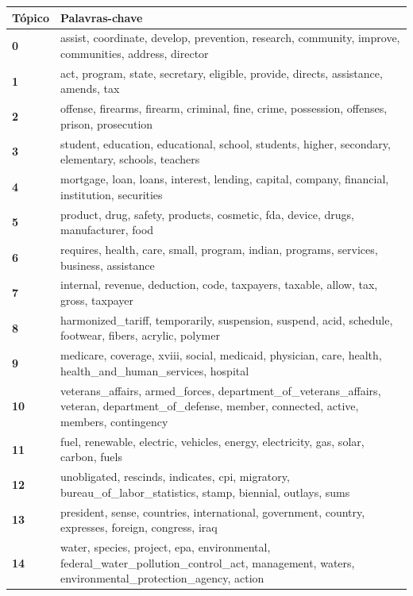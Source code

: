 \begin{table}[htpb]
    \centering
    \scriptsize
    \begin{tabularx}{\textwidth}{@{}l X@{}}
        \toprule
        \textbf{Tópico} & \textbf{Palavras-chave} \\
        \midrule
        \textbf{0} & assist, coordinate, develop, prevention, research, community, improve, communities, address, director \\
        \textbf{1} & act, program, state, secretary, eligible, provide, directs, assistance, amends, tax \\
        \textbf{2} & offense, firearms, firearm, criminal, fine, crime, possession, offenses, prison, prosecution \\
        \textbf{3} & student, education, educational, school, students, higher, secondary, elementary, schools, teachers \\
        \textbf{4} & mortgage, loan, loans, interest, lending, capital, company, financial, institution, securities \\
        \textbf{5} & product, drug, safety, products, cosmetic, fda, device, drugs, manufacturer, food \\
        \textbf{6} & requires, health, care, small, program, indian, programs, services, business, assistance \\
        \textbf{7} & internal, revenue, deduction, code, taxpayers, taxable, allow, tax, gross, taxpayer \\
        \textbf{8} & harmonized\_tariff, temporarily, suspension, suspend, acid, schedule, footwear, fibers, acrylic, polymer \\
        \textbf{9} & medicare, coverage, xviii, social, medicaid, physician, care, health, health\_and\_human\_services, hospital \\
        \textbf{10} & veterans\_affairs, armed\_forces, department\_of\_veterans\_affairs, veteran, department\_of\_defense, member, connected, active, members, contingency \\
        \textbf{11} & fuel, renewable, electric, vehicles, energy, electricity, gas, solar, carbon, fuels \\
        \textbf{12} & unobligated, rescinds, indicates, cpi, migratory, bureau\_of\_labor\_statistics, stamp, biennial, outlays, sums \\
        \textbf{13} & president, sense, countries, international, government, country, expresses, foreign, congress, iraq \\
        \textbf{14} & water, species, project, epa, environmental, federal\_water\_pollution\_control\_act, management, waters, environmental\_protection\_agency, action \\

\end{tabularx}
\end{table}
